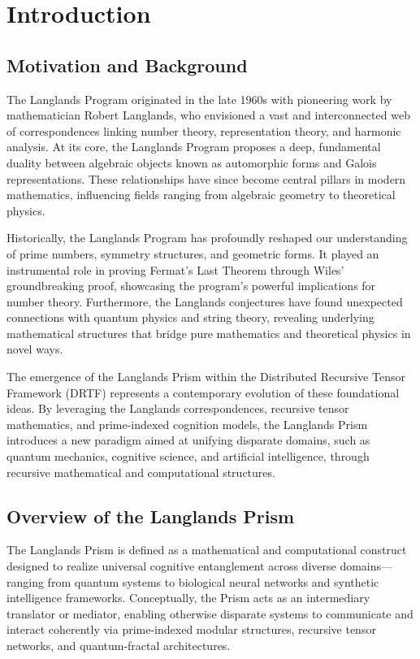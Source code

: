 \documentclass[11pt]{article}
\begin{document}
\newpage

\section{Introduction}

\subsection{Motivation and Background}

The Langlands Program originated in the late 1960s with pioneering work by mathematician Robert Langlands, who envisioned a vast and interconnected web of correspondences linking number theory, representation theory, and harmonic analysis. At its core, the Langlands Program proposes a deep, fundamental duality between algebraic objects known as automorphic forms and Galois representations. These relationships have since become central pillars in modern mathematics, influencing fields ranging from algebraic geometry to theoretical physics.

Historically, the Langlands Program has profoundly reshaped our understanding of prime numbers, symmetry structures, and geometric forms. It played an instrumental role in proving Fermat's Last Theorem through Wiles' groundbreaking proof, showcasing the program's powerful implications for number theory. Furthermore, the Langlands conjectures have found unexpected connections with quantum physics and string theory, revealing underlying mathematical structures that bridge pure mathematics and theoretical physics in novel ways.

The emergence of the Langlands Prism within the Distributed Recursive Tensor Framework (DRTF) represents a contemporary evolution of these foundational ideas. By leveraging the Langlands correspondences, recursive tensor mathematics, and prime-indexed cognition models, the Langlands Prism introduces a new paradigm aimed at unifying disparate domains, such as quantum mechanics, cognitive science, and artificial intelligence, through recursive mathematical and computational structures.

\subsection{Overview of the Langlands Prism}

The Langlands Prism is defined as a mathematical and computational construct designed to realize universal cognitive entanglement across diverse domains—ranging from quantum systems to biological neural networks and synthetic intelligence frameworks. Conceptually, the Prism acts as an intermediary translator or mediator, enabling otherwise disparate systems to communicate and interact coherently via prime-indexed modular structures, recursive tensor networks, and quantum-fractal architectures.
\end{document}

